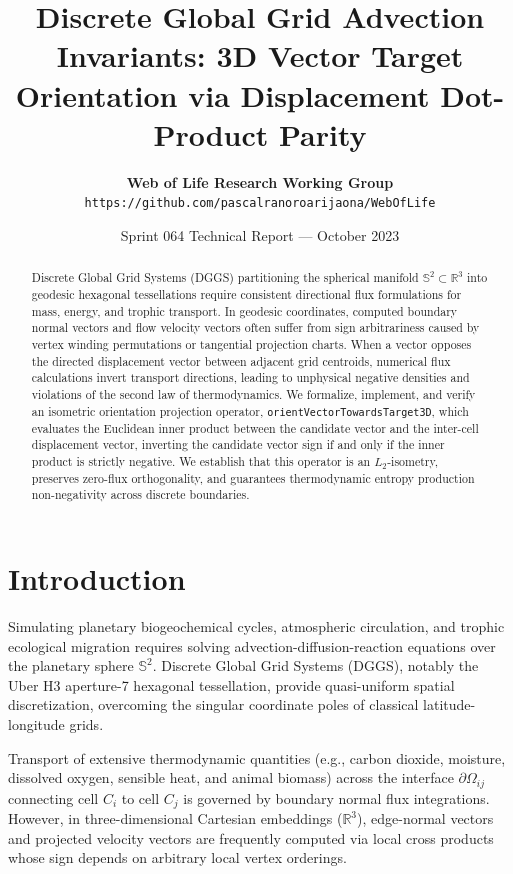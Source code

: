 \documentclass[11pt,a4paper]{article}
\title{\textbf{Discrete Global Grid Advection Invariants: 3D Vector Target Orientation via Displacement Dot-Product Parity}}
\author{
  \textbf{Web of Life Research Working Group} \\
  \texttt{https://github.com/pascalranoroarijaona/WebOfLife}
}
\date{Sprint 064 Technical Report --- October 2023}
\theoremstyle{plain}
\theoremstyle{definition}
\begin{document}
\maketitle

\begin{abstract}
Discrete Global Grid Systems (DGGS) partitioning the spherical manifold $\mathbb{S}^2 \subset \mathbb{R}^3$ into geodesic hexagonal tessellations require consistent directional flux formulations for mass, energy, and trophic transport. In geodesic coordinates, computed boundary normal vectors and flow velocity vectors often suffer from sign arbitrariness caused by vertex winding permutations or tangential projection charts. When a vector opposes the directed displacement vector between adjacent grid centroids, numerical flux calculations invert transport directions, leading to unphysical negative densities and violations of the second law of thermodynamics. We formalize, implement, and verify an isometric orientation projection operator, \texttt{orientVectorTowardsTarget3D}, which evaluates the Euclidean inner product between the candidate vector and the inter-cell displacement vector, inverting the candidate vector sign if and only if the inner product is strictly negative. We establish that this operator is an $L_2$-isometry, preserves zero-flux orthogonality, and guarantees thermodynamic entropy production non-negativity across discrete boundaries.
\end{abstract}

\section{Introduction}
Simulating planetary biogeochemical cycles, atmospheric circulation, and trophic ecological migration requires solving advection-diffusion-reaction equations over the planetary sphere $\mathbb{S}^2$. Discrete Global Grid Systems (DGGS), notably the Uber H3 aperture-7 hexagonal tessellation, provide quasi-uniform spatial discretization, overcoming the singular coordinate poles of classical latitude-longitude grids.

Transport of extensive thermodynamic quantities (e.g., carbon dioxide, moisture, dissolved oxygen, sensible heat, and animal biomass) across the interface $\partial \Omega_{ij}$ connecting cell $C_i$ to cell $C_j$ is governed by boundary normal flux integrations. However, in three-dimensional Cartesian embeddings ($\mathbb{R}^3$), edge-normal vectors and projected velocity vectors are frequently computed via local cross products whose sign depends on arbitrary local vertex orderings.
\end{document}
